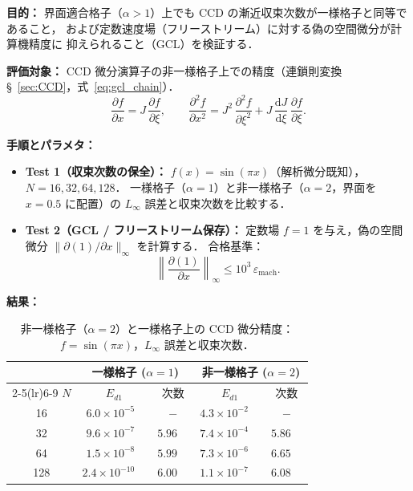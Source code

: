 %

\noindent\textbf{目的：}
界面適合格子（$\alpha>1$）上でも CCD の漸近収束次数が一様格子と同等であること，
および定数速度場（フリーストリーム）に対する偽の空間微分が計算機精度に
抑えられること（GCL）を検証する．

\noindent\textbf{評価対象：}
CCD 微分演算子の非一様格子上での精度（連鎖則変換 §~\ref{sec:CCD}，式~\eqref{eq:gcl_chain}）．
\begin{equation}
  \frac{\partial f}{\partial x} = J\,\frac{\partial f}{\partial\xi}, \qquad
  \frac{\partial^2 f}{\partial x^2}
    = J^2\,\frac{\partial^2 f}{\partial\xi^2}
      + J\,\frac{\mathrm{d}J}{\mathrm{d}\xi}\,\frac{\partial f}{\partial\xi}.
  \label{eq:gcl_chain}
\end{equation}

\noindent\textbf{手順とパラメタ：}
\begin{itemize}[noitemsep]
  \item \textbf{Test 1（収束次数の保全）：}
        $f(x)=\sin(\pi x)$（解析微分既知），$N=16,32,64,128$．
        一様格子（$\alpha=1$）と非一様格子（$\alpha=2$，界面を $x=0.5$ に配置）の
        $L_\infty$ 誤差と収束次数を比較する．
  \item \textbf{Test 2（GCL / フリーストリーム保存）：}
        定数場 $f=1$ を与え，偽の空間微分 $\|\partial(1)/\partial x\|_\infty$ を計算する．
        合格基準：
        \begin{equation}
          \left\|\frac{\partial(1)}{\partial x}\right\|_\infty \leq 10^3\,\varepsilon_\mathrm{mach}.
          \label{eq:gcl_criterion}
        \end{equation}
\end{itemize}

\noindent\textbf{結果：}

\begin{table}[htbp]
\centering
\caption{非一様格子（$\alpha=2$）と一様格子上の CCD 微分精度：
  $f=\sin(\pi x)$，$L_\infty$ 誤差と収束次数．}
\label{tab:gcl_convergence}
\renewcommand{\arraystretch}{1.3}
\begin{tabular}{c
                r@{\ }l r@{\ }l
                r@{\ }l r@{\ }l}
\toprule
& \multicolumn{4}{c}{一様格子 ($\alpha=1$)}
& \multicolumn{4}{c}{非一様格子 ($\alpha=2$)} \\
\cmidrule(lr){2-5}\cmidrule(lr){6-9}
$N$
& \multicolumn{2}{c}{$E_{d1}$} & \multicolumn{2}{c}{次数}
& \multicolumn{2}{c}{$E_{d1}$} & \multicolumn{2}{c}{次数} \\
\midrule
 16 & $6.0\!\times\!10^{-5}$  & & $-$   & & $4.3\!\times\!10^{-2}$  & & $-$   & \\
 32 & $9.6\!\times\!10^{-7}$  & & $5.96$& & $7.4\!\times\!10^{-4}$  & & $5.86$& \\
 64 & $1.5\!\times\!10^{-8}$  & & $5.99$& & $7.3\!\times\!10^{-6}$  & & $6.65$& \\
128 & $2.4\!\times\!10^{-10}$ & & $6.00$& & $1.1\!\times\!10^{-7}$  & & $6.08$& \\
\bottomrule
\end{tabular}
\end{table}

